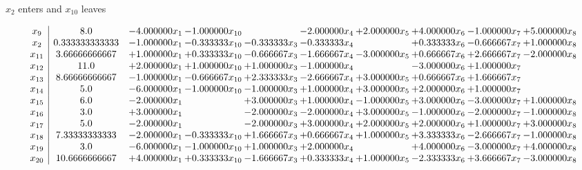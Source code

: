 \documentclass[10pt]{article}
\begin{document}
 $ x_{2} $ enters and $ x_{10} $ leaves 

 \[\begin{array}{c| c c@{\hskip 2pt} c@{\hskip 2pt} c@{\hskip 2pt} c@{\hskip 2pt} c@{\hskip 2pt} c@{\hskip 2pt} c@{\hskip 2pt} c@{\hskip 2pt} }
 x_{9}   &  8.0 & -4.000000 x_{1} & -1.000000 x_{10} &   & -2.000000 x_{4} & + 2.000000 x_{5} & + 4.000000 x_{6} & -1.000000 x_{7} & + 5.000000 x_{8}\\
 x_{2}   &  0.333333333333 & -1.000000 x_{1} & -0.333333 x_{10} & -0.333333 x_{3} & -0.333333 x_{4} &   & + 0.333333 x_{6} & -0.666667 x_{7} & + 1.000000 x_{8}\\
 x_{11}   &  3.66666666667 & + 1.000000 x_{1} & + 0.333333 x_{10} & -0.666667 x_{3} & -1.666667 x_{4} & -3.000000 x_{5} & + 0.666667 x_{6} & + 2.666667 x_{7} & -2.000000 x_{8}\\
 x_{12}   &  11.0 & + 2.000000 x_{1} & + 1.000000 x_{10} & + 1.000000 x_{3} & -1.000000 x_{4} &   & -3.000000 x_{6} & + 1.000000 x_{7} &   \\
 x_{13}   &  8.66666666667 & -1.000000 x_{1} & -0.666667 x_{10} & + 2.333333 x_{3} & -2.666667 x_{4} & + 3.000000 x_{5} & + 0.666667 x_{6} & + 1.666667 x_{7} &   \\
 x_{14}   &  5.0 & -6.000000 x_{1} & -1.000000 x_{10} & -1.000000 x_{3} & + 1.000000 x_{4} & + 3.000000 x_{5} & + 2.000000 x_{6} & + 1.000000 x_{7} &   \\
 x_{15}   &  6.0 & -2.000000 x_{1} &   & + 3.000000 x_{3} & + 1.000000 x_{4} & -1.000000 x_{5} & + 3.000000 x_{6} & -3.000000 x_{7} & + 1.000000 x_{8}\\
 x_{16}   &  3.0 & + 3.000000 x_{1} &   & -2.000000 x_{3} & -2.000000 x_{4} & + 3.000000 x_{5} & -1.000000 x_{6} & -2.000000 x_{7} & -1.000000 x_{8}\\
 x_{17}   &  5.0 & -2.000000 x_{1} &   & -2.000000 x_{3} & + 3.000000 x_{4} & + 2.000000 x_{5} & + 2.000000 x_{6} & + 1.000000 x_{7} & + 3.000000 x_{8}\\
 x_{18}   &  7.33333333333 & -2.000000 x_{1} & -0.333333 x_{10} & + 1.666667 x_{3} & + 0.666667 x_{4} & + 1.000000 x_{5} & + 3.333333 x_{6} & -2.666667 x_{7} & -1.000000 x_{8}\\
 x_{19}   &  3.0 & -6.000000 x_{1} & -1.000000 x_{10} & + 1.000000 x_{3} & + 2.000000 x_{4} &   & + 4.000000 x_{6} & -3.000000 x_{7} & + 4.000000 x_{8}\\
 x_{20}   &  10.6666666667 & + 4.000000 x_{1} & + 0.333333 x_{10} & -1.666667 x_{3} & + 0.333333 x_{4} & + 1.000000 x_{5} & -2.333333 x_{6} & + 3.666667 x_{7} & -3.000000 x_{8}\\

\end{array}\]
\end{document}
